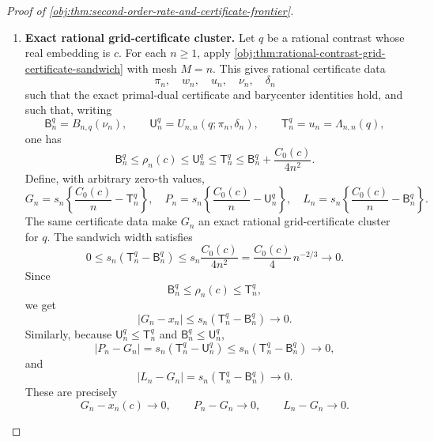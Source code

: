 \begin{proof}[Proof of \cref{obj:thm:second-order-rate-and-certificate-frontier}]
\begin{enumerate}
\item \textbf{Exact rational grid-certificate cluster.}
Let \(q\) be a rational contrast whose real embedding is \(c\). For each \(n\ge1\), apply \cref{obj:thm:rational-contrast-grid-certificate-sandwich} with mesh \(M=n\). This gives rational certificate data
\[
\pi_n,\quad w_n,\quad u_n,\quad \nu_n,\quad \delta_n
\]
such that the exact primal-dual certificate and barycenter identities hold, and such that, writing
\[
\mathsf B_n^q=B_{n,q}(\nu_n),
\qquad
\mathsf U_n^q=U_{n,n}(q;\pi_n,\delta_n),
\qquad
\mathsf T_n^q=u_n=\Lambda_{n,n}(q),
\]
one has
\[
\mathsf B_n^q
\le
\rho_n(c)
\le
\mathsf U_n^q
\le
\mathsf T_n^q
\le
\mathsf B_n^q+\frac{C_0(c)}{4n^2}.
\]
Define, with arbitrary zero-th values,
\[
G_n=s_n\left\{\frac{C_0(c)}{n}-\mathsf T_n^q\right\},
\quad
P_n=s_n\left\{\frac{C_0(c)}{n}-\mathsf U_n^q\right\},
\quad
L_n=s_n\left\{\frac{C_0(c)}{n}-\mathsf B_n^q\right\}.
\]
The same certificate data make \(G_n\) an exact rational grid-certificate cluster for \(q\). The sandwich width satisfies
\[
0\le
s_n(\mathsf T_n^q-\mathsf B_n^q)
\le
s_n\frac{C_0(c)}{4n^2}
=
\frac{C_0(c)}4\,n^{-2/3}
\longrightarrow0.
\]
Since
\[
\mathsf B_n^q\le \rho_n(c)\le \mathsf T_n^q,
\]
we get
\[
|G_n-x_n|
\le
s_n(\mathsf T_n^q-\mathsf B_n^q)\to0.
\]
Similarly, because \(\mathsf U_n^q\le\mathsf T_n^q\) and \(\mathsf B_n^q\le\mathsf U_n^q\),
\[
|P_n-G_n|
=
s_n(\mathsf T_n^q-\mathsf U_n^q)
\le
s_n(\mathsf T_n^q-\mathsf B_n^q)\to0,
\]
and
\[
|L_n-G_n|
=
s_n(\mathsf T_n^q-\mathsf B_n^q)\to0.
\]
These are precisely
\[
G_n-x_n(c)\to0,\qquad
P_n-G_n\to0,\qquad
L_n-G_n\to0.
\] %


\end{enumerate}
\end{proof}
